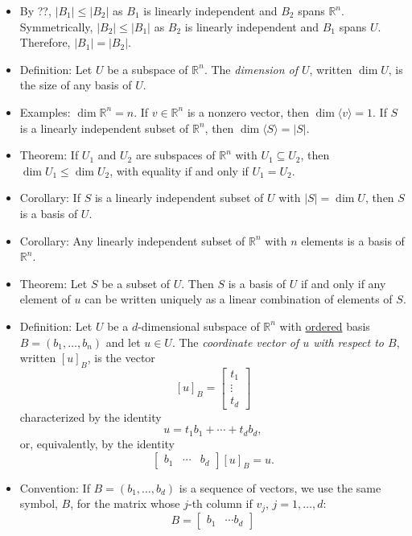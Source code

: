 \documentclass{amsart}
\newcommand{\RR}{\mathbb{R}}
\begin{document}
\begin{itemize}
  \item By ??, $|B_1|\leq |B_2|$ as $B_1$ is linearly independent and $B_2$ spans $\RR^n$.
  Symmetrically, $|B_2|\leq |B_1|$ as $B_2$ is linearly independent and $B_1$ spans $U$.
    Therefore, $|B_1|=|B_2|$.

  \item Definition: Let $U$ be a subspace of $\RR^n$.
  The \emph{dimension of $U$}, written $\dim U$, is the size of any basis of $U$.

  \item Examples: $\dim\RR^n = n$. If $v\in\RR^n$ is a nonzero vector, then $\dim \langle v\rangle=1$. If $S$ is a linearly independent subset of $\RR^n$, then $\dim \langle S\rangle = |S|$.

  \item Theorem: If $U_1$ and $U_2$ are subspaces of $\RR^n$ with $U_1\subseteq U_2$, then $\dim U_1\leq \dim U_2$, with equality if and only if $U_1=U_2$.

  \item Corollary: If $S$ is a linearly independent subset of $U$ with $|S|=\dim U$, then $S$ is a basis of $U$.

  \item Corollary: Any linearly independent subset of $\RR^n$ with $n$ elements is a basis of $\RR^n$.

  \item Theorem: Let $S$ be a subset of $U$.
  Then $S$ is a basis of $U$ if and only if any element of $u$ can be written uniquely as a linear combination of elements of $S$.

  \item Definition: Let $U$ be a $d$-dimensional subspace of $\RR^n$ with \underline{ordered} basis $B=(b_1,\ldots,b_n)$ and let $u\in U$.
  The \emph{coordinate vector of $u$ with respect to $B$}, written $[u]_B$, is the vector
\[
[u]_B=\begin{bmatrix}t_1\\\vdots\\ t_d\end{bmatrix}
  \]
  characterized by the identity
  \[
    u = t_1b_1+\cdots + t_db_d,
  \]
or, equivalently, by the identity
\[\begin{bmatrix}b_1&\cdots&b_d\end{bmatrix}[u]_B=u.
  \]

  \item Convention: If $B = (b_1,\ldots,b_d)$ is a sequence of vectors, we use the same symbol, $B$, for the matrix whose $j$-th column if $v_j$, $j=1,\ldots,d$:
  \[
  B=\begin{bmatrix}b_1&\cdots b_d\end{bmatrix}
  \]
  

\end{itemize}
\end{document}
